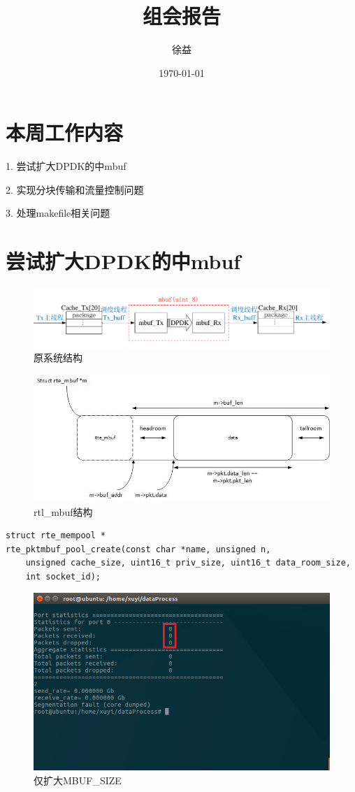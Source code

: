 \documentclass{article}
\title{组会报告}
\author{徐益}
\date{\today}
\begin{document}
	
\maketitle


\section{本周工作内容}

1. 尝试扩大DPDK的中mbuf

2. 实现分块传输和流量控制问题

3. 处理makefile相关问题

\section{尝试扩大DPDK的中mbuf}
\begin{figure}[H]
	\centering
	\includegraphics[width = \textwidth]{frame_sys_old.pdf}
	\caption{原系统结构}
\end{figure}
\begin{figure}[H]
	\centering
	\includegraphics[width = .8\textwidth]{structure_mbuf.jpg}
	\caption{rtl\_mbuf结构}
\end{figure}
\lstset{language=C++}
\begin{lstlisting}
struct rte_mempool *
rte_pktmbuf_pool_create(const char *name, unsigned n,
	unsigned cache_size, uint16_t priv_size, uint16_t data_room_size,
	int socket_id);
\end{lstlisting}
\begin{figure}[H]
	\centering
	\includegraphics[width = .8\textwidth]{fault_dumped.png}
	\caption{仅扩大MBUF\_SIZE}
\end{figure}
\end{document}
